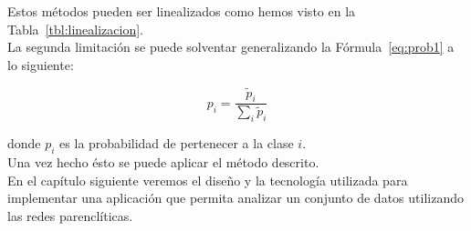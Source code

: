 Estos métodos pueden ser linealizados como hemos visto en la Tabla~\ref{tbl:linealizacion}.\\

La segunda limitación se puede solventar generalizando la Fórmula~\ref{eq:prob1} a lo siguiente:

\begin{equation}
p_i = \dfrac{\tilde{p}_i}{\displaystyle \sum_{i} \tilde{p}_i }
\end{equation}

donde ${p}_i$ es la probabilidad de pertenecer a la clase $i$.\\

Una vez hecho ésto se puede aplicar el método descrito.\\

En el capítulo siguiente veremos el diseño y la tecnología utilizada para implementar una aplicación que permita analizar un conjunto de datos utilizando las redes parenclíticas.